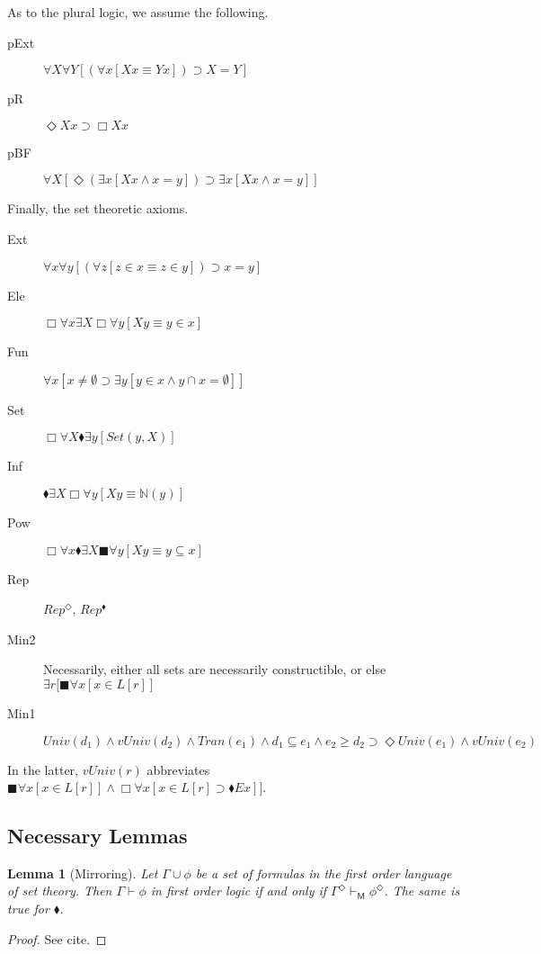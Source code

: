 \documentclass{article}
\newcommand\D{\blacklozenge}
\newcommand\B{\blacksquare}
\newtheorem{lemma}{Lemma}
\begin{document}
As to the plural logic, we assume the following.
\begin{description}
    \item[pExt] $\forall X \forall Y [(\forall x[Xx \equiv Yx]) \supset X = Y]$
    \item[pR] $ \Diamond Xx \supset \Box Xx$
    \item[pBF] $\forall X[ \Diamond (\exists x[Xx \wedge x = y]) \supset \exists x [Xx \wedge x = y]]$
\end{description}
Finally, the set theoretic axioms.
\begin{description}
    \item[Ext] $\forall x \forall y [(\forall z[z \in x \equiv z \in y]) \supset x = y]$
    \item[Ele] $\Box \forall x \exists X \Box \forall y[Xy \equiv y \in x]$
    \item[Fun] $\forall x[ x \not = \emptyset \supset \exists y[y \in x \wedge y \cap x = \emptyset]]$
    \item[Set] $\Box \forall X \D \exists y [Set(y, X)]$
    \item[Inf] $\D \exists X\Box \forall y[Xy \equiv \mathbb{N}(y)]$
    \item[Pow] $\Box \forall x \D \exists X \B \forall y [Xy \equiv y \subseteq x]$
    \item[Rep] $Rep^\Diamond$, $Rep^\D$
    \item[Min2] Necessarily, either all sets are necessarily constructible, or else $\exists r[\B \forall x[x \in L[r]]$
    \item[Min1] $Univ(d_1) \wedge vUniv(d_2) \wedge Tran(e_1) \wedge d_1 \subseteq e_1 \wedge e_2 \geq d_2 \supset \Diamond Univ(e_1) \wedge vUniv(e_2)$ 
\end{description}
In the latter, $vUniv(r)$ abbreviates $\B \forall x [x \in L[r]] \wedge \Box \forall x[x \in L[r] \supset \D Ex]]$.
\subsection{Necessary Lemmas}
\begin{lemma}[Mirroring]
    Let $\Gamma 
    \cup {\phi}$ be a set of formulas in the first order language of set theory. Then
    $\Gamma \vdash \phi$ in first order logic if and only if 
    $\Gamma^\Diamond \vdash_\mathsf{M} \phi^\Diamond$. 
    The same is true for $\D$.
\end{lemma}
\begin{proof}
    See cite.
\end{proof}
\end{document}
